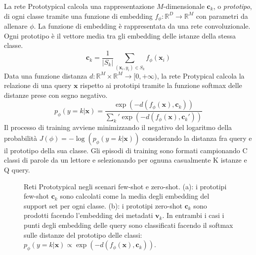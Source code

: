 \documentclass[12pt,a4paper,titlepage]{article}
\begin{document}
La rete Prototypical calcola una rappresentazione $M$-dimensionale $\mathbf{c}_k$, o \emph{prototipo}, di ogni classe tramite una funzione di embedding $f_\phi : \mathbb{R}^D \rightarrow \mathbb{R}^M$ con parametri da allenare $\phi$. La funzione di embedding è rappresentata da una rete convoluzionale. Ogni prototipo è il vettore media tra gli embedding delle istanze della stessa classe.
\begin{equation}
	\mathbf{c}_k=\frac{1}{|S_k|}\sum_{(\mathbf{x}_i,y_i)\in S_k}f_\phi (\mathbf{x}_i)
\end{equation}
Data una funzione distanza $d: \mathbb{R}^M \times \mathbb{R}^M \rightarrow [0, +\infty )$, la rete Protypical calcola la relazione di una query $\mathbf{x}$ rispetto ai prototipi tramite la funzione softmax delle distanze prese con segno negativo.
\begin{equation}
p_\phi(y=k|\mathbf{x})=\dfrac{\exp(-d(f_\phi(\mathbf{x}),\mathbf{c}_k))}{\sum_k' \exp(-d(f_\phi(\mathbf{x}),\mathbf{c}_k'))}
\end{equation}
Il processo di training avviene minimizzando il negativo del logaritmo della probabilità $J(\phi)=-\log\left(p_\phi(y=k|\mathbf{x})\right)$ considerando la distanza fra query e il prototipo della sua classe.
Gli episodi di training sono formati campionando C classi di parole da un lettore e selezionando per ognuna casualmente K istanze e Q query.

\begin{figure}[h]
	\centering
	\qquad
	\label{fig:proto_few_zero_shot}	
	\caption{Reti Prototypical negli scenari few-shot e zero-shot. (a): i prototipi few-shot $\mathbf{c}_k$ sono calcolati come la media degli embedding del support set per ogni classe. (b): i prototipi zero-shot $\mathbf{c}_k$ sono prodotti facendo l'embedding dei metadati $\mathbf{v}_k$. In entrambi i casi i punti degli embedding delle query sono classificati facendo il softmax sulle distanze del prototipo delle classi: $p_\phi(y = k|\mathbf{x}) \propto \exp \left(-d(f_\phi(\mathbf{x}),\mathbf{c}_k) \right)$.~\cite{snell:prototypical}}
\end{figure}
\clearpage
\end{document}

